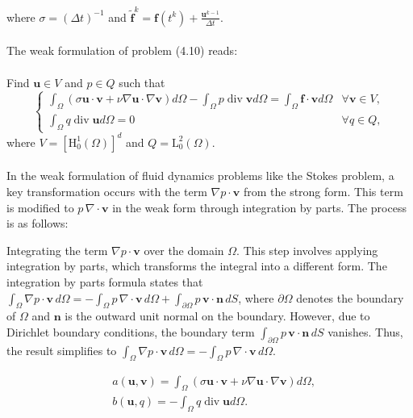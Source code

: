 \documentclass[11pt]{book}
\begin{document}
where $\sigma=(\Delta t)^{-1}$ and $\tilde{\mathbf{f}}^{k}=\mathbf{f}\left(t^{k}\right)+\frac{\mathbf{u}^{k-1}}{\Delta t}$.\\ \\
The weak formulation of problem (4.10) reads:\\ \\
Find $\mathbf{u} \in V$ and $p \in Q$ such that
\begin{equation}
\begin{cases}\int_{\Omega}(\sigma \mathbf{u} \cdot \mathbf{v}+\nu \nabla \mathbf{u} \cdot \nabla \mathbf{v}) d \Omega-\int_{\Omega} p \operatorname{div} \mathbf{v} d \Omega=\int_{\Omega} \mathbf{f} \cdot \mathbf{v} d \Omega & \forall \mathbf{v} \in V, \\ \int_{\Omega} q \operatorname{div} \mathbf{u} d \Omega=0 & \forall q \in Q,\end{cases}
\end{equation}
where $V=\left[\mathrm{H}_{0}^{1}(\Omega)\right]^{d}$ and $Q=\mathrm{L}_{0}^{2}(\Omega)$.\\ \\
In the weak formulation of fluid dynamics problems like the Stokes problem, a key transformation occurs with the term \(\nabla p \cdot \mathbf{v}\) from the strong form. This term is modified to \(p \, \nabla \cdot \mathbf{v}\) in the weak form through integration by parts. The process is as follows:

Integrating the term \(\nabla p \cdot \mathbf{v}\) over the domain \(\Omega\). This step involves applying integration by parts, which transforms the integral into a different form. The integration by parts formula states that \(\int_{\Omega} \nabla p \cdot \mathbf{v} \, d\Omega = -\int_{\Omega} p \, \nabla \cdot \mathbf{v} \, d\Omega + \int_{\partial\Omega} p \, \mathbf{v} \cdot \mathbf{n} \, dS\), where \(\partial\Omega\) denotes the boundary of \(\Omega\) and \(\mathbf{n}\) is the outward unit normal on the boundary. However, due to Dirichlet boundary conditions, the boundary term \(\int_{\partial\Omega} p \, \mathbf{v} \cdot \mathbf{n} \, dS\) vanishes. Thus, the result simplifies to \(\int_{\Omega} \nabla p \cdot \mathbf{v} \, d\Omega = -\int_{\Omega} p \, \nabla \cdot \mathbf{v} \, d\Omega\).


\begin{equation}
\begin{aligned}
& a(\mathbf{u}, \mathbf{v})=\int_{\Omega}(\sigma \mathbf{u} \cdot \mathbf{v}+\nu \nabla \mathbf{u} \cdot \nabla \mathbf{v}) d \Omega, \\
& b(\mathbf{u}, q)=-\int_{\Omega} q \operatorname{div} \mathbf{u} d \Omega .
\end{aligned}
\end{equation}
\end{document}

